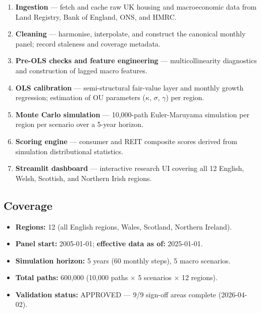 \documentclass[11pt,a4paper]{article}
\theoremstyle{plain}
\theoremstyle{definition}
\newcommand{\kap}{\kappa}
\newcommand{\sig}{\sigma}
\begin{document}
\begin{enumerate}[leftmargin=1.8em, label=\textbf{\arabic*.}]
  \item \textbf{Ingestion} --- fetch and cache raw UK housing and
        macroeconomic data from Land Registry, Bank of England, ONS, and HMRC.
  \item \textbf{Cleaning} --- harmonise, interpolate, and construct the
        canonical monthly panel; record staleness and coverage metadata.
  \item \textbf{Pre-OLS checks and feature engineering} --- multicollinearity
        diagnostics and construction of lagged macro features.
  \item \textbf{OLS calibration} --- semi-structural fair-value layer and
        monthly growth regression; estimation of OU parameters ($\kap$, $\sig$,
        $\gamma$) per region.
  \item \textbf{Monte Carlo simulation} --- 10,000-path Euler-Maruyama
        simulation per region per scenario over a 5-year horizon.
  \item \textbf{Scoring engine} --- consumer and REIT composite scores derived
        from simulation distributional statistics.
  \item \textbf{Streamlit dashboard} --- interactive research UI covering all
        12 English, Welsh, Scottish, and Northern Irish regions.
\end{enumerate}

\subsection{Coverage}

\begin{itemize}[leftmargin=1.8em]
  \item \textbf{Regions:} 12 (all English regions, Wales, Scotland, Northern Ireland).
  \item \textbf{Panel start:} 2005-01-01; \textbf{effective data as of:} 2025-01-01.
  \item \textbf{Simulation horizon:} 5 years (60 monthly steps), 5 macro scenarios.
  \item \textbf{Total paths:} 600,000 (10,000 paths $\times$ 5 scenarios $\times$ 12 regions).
  \item \textbf{Validation status:} APPROVED --- 9/9 sign-off areas complete (2026-04-02).
\end{itemize}

\end{document}
